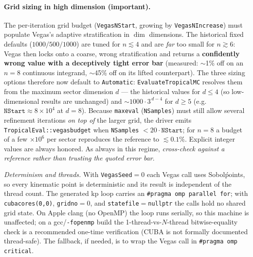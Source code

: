 \documentclass[11pt,a4paper]{article}
\begin{document}
\paragraph{Grid sizing in high dimension (important).} The per-iteration grid
budget (\texttt{VegasNStart}, growing by \texttt{VegasNIncrease}) must populate
Vegas's adaptive stratification in $\dim$ dimensions. The historical fixed
defaults ($1000/500/1000$) are tuned for $n\lesssim4$ and are \emph{far} too
small for $n\gtrsim6$: Vegas then locks onto a coarse, wrong stratification and
returns a \textbf{confidently wrong value with a deceptively tight error bar}
(measured: $\sim$1\% off on an $n=8$ continuous integrand, $\sim$45\% off on its
lifted counterpart). The three sizing options therefore now default to
\texttt{Automatic}: \texttt{EvaluateTropicalMC} resolves them from the maximum
sector dimension $d$ --- the historical values for $d\le4$ (so low-dimensional
results are unchanged) and $\sim 1000\cdot3^{\,d-4}$ for $d\ge5$ (e.g.\
$\texttt{NStart}\approx 8\times10^{4}$ at $d=8$). Because \texttt{maxeval}
(\texttt{NSamples}) must still allow several refinement iterations \emph{on top
of} the larger grid, the driver emits \texttt{TropicalEval::vegasbudget} when
\texttt{NSamples} $< 20\cdot\texttt{NStart}$; for $n=8$ a budget of a few
$\times10^{6}$ per sector reproduces the reference to $\lesssim0.1\%$. Explicit
integer values are always honored. As always in this regime, \emph{cross-check
against a reference rather than trusting the quoted error bar}.

\emph{Determinism and threads.} With \texttt{VegasSeed}${}=0$ each Vegas call
uses Sobol\' points, so every kinematic point is deterministic and its result is
independent of the thread count. The generated kp loop carries an
\texttt{\#pragma omp parallel for}; with \texttt{cubacores(0,0)},
\texttt{gridno}${}=0$, and \texttt{statefile}${}=$\texttt{nullptr} the calls hold
no shared grid state. On Apple clang (no OpenMP) the loop runs serially, so this
machine is unaffected; on a gcc/\texttt{-fopenmp} build the 1-thread-vs-$N$-thread
bitwise-equality check is a recommended one-time verification (CUBA is not
formally documented thread-safe). The fallback, if needed, is to wrap the Vegas
call in \texttt{\#pragma omp critical}.
\end{document}
